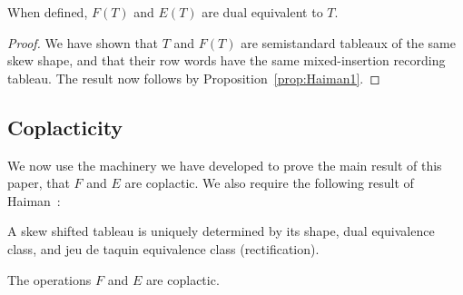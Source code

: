 \documentclass[ALCO,ThmDefs,Unicode,epreuves]{cedram}
\begin{document}
\begin{coro} \label{cor:FE-dual-equiv}
When defined, $F(T)$ and $E(T)$ are dual equivalent to $T$.
\end{coro}

\begin{proof}
We have shown that $T$ and $F(T)$ are semistandard tableaux of the same skew shape, and that their row words have the same mixed-insertion recording tableau. The result now follows by Proposition~\ref{prop:Haiman1}.
\end{proof}

\subsection{Coplacticity}

We now use the machinery we have developed to prove the main result of this paper, that $F$ and $E$ are coplactic. We also require the following result of Haiman~\cite{Haiman}:

\begin{prop} \label{prop:Haiman2}
A skew shifted tableau is uniquely determined by its shape, dual equivalence class, and jeu de taquin equivalence class \textup{(}rectification\textup{)}.
\end{prop}


\begin{theorem}\label{thm:coplactic}
The operations $F$ and $E$ are coplactic.
\end{theorem}
\end{document}
